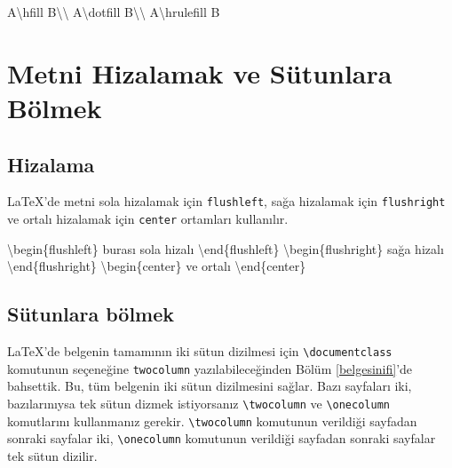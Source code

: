 \documentclass[
  10pt,
]{scrbook}
\newenvironment{Shaded}{\begin{snugshade}}{\end{snugshade}}
\newcommand{\NormalTok}[1]{#1}
\begin{document}
\begin{Shaded}
\begin{Highlighting}[]
\NormalTok{A\textbackslash{}hfill B\textbackslash{}\textbackslash{}}
\NormalTok{A\textbackslash{}dotfill B\textbackslash{}\textbackslash{}}
\NormalTok{A\textbackslash{}hrulefill B}
\end{Highlighting}
\end{Shaded}

\hypertarget{metni-hizalamak-ve-suxfctunlara-buxf6lmek}{%
\section{Metni Hizalamak ve Sütunlara Bölmek}\label{metni-hizalamak-ve-suxfctunlara-buxf6lmek}}

\hypertarget{hizalama}{%
\subsection{Hizalama}\label{hizalama}}

LaTeX'de metni sola hizalamak için \texttt{flushleft}, sağa hizalamak için
\texttt{flushright} ve ortalı hizalamak için \texttt{center} ortamları kullanılır.

\begin{Shaded}
\begin{Highlighting}[]
\NormalTok{\textbackslash{}begin\{flushleft\}}
\NormalTok{ burası sola hizalı}
\NormalTok{\textbackslash{}end\{flushleft\}}
\NormalTok{\textbackslash{}begin\{flushright\}}
\NormalTok{ sağa hizalı}
\NormalTok{\textbackslash{}end\{flushright\}}
\NormalTok{\textbackslash{}begin\{center\}}
\NormalTok{ ve ortalı}
\NormalTok{\textbackslash{}end\{center\}}
\end{Highlighting}
\end{Shaded}

\hypertarget{suxfctunlara-buxf6lmek}{%
\subsection{Sütunlara bölmek}\label{suxfctunlara-buxf6lmek}}

LaTeX'de belgenin tamamının iki sütun dizilmesi için \texttt{\textbackslash{}documentclass}
komutunun seçeneğine \texttt{twocolumn} yazılabileceğinden Bölüm \ref{belgesinifi}'de bahsettik. Bu, tüm belgenin iki sütun dizilmesini sağlar. Bazı
sayfaları iki, bazılarınıysa tek sütun dizmek istiyorsanız \texttt{\textbackslash{}twocolumn}
ve \texttt{\textbackslash{}onecolumn} komutlarını kullanmanız gerekir. \texttt{\textbackslash{}twocolumn} komutunun
verildiği sayfadan sonraki sayfalar iki, \texttt{\textbackslash{}onecolumn} komutunun
verildiği sayfadan sonraki sayfalar tek sütun dizilir.
\end{document}
